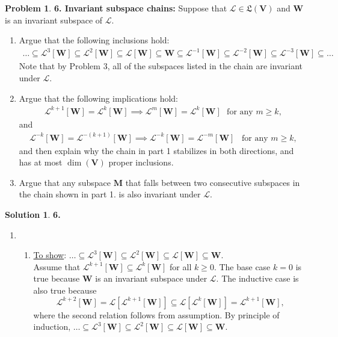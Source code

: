 \documentclass{book}
\theoremstyle{definition}
\newtheorem*{prob*}{Problem}
\newtheorem*{sln*}{Solution}
\newcommand{\V}{\mathbf{V}}
\newcommand{\W}{\mathbf{W}}
\newcommand{\lag}{\mathcal{L}}
\begin{document}
\newpage

\begin{prob*}\textbf{6. Invariant subspace chains:} Suppose that $\lag \in \mathfrak{L}(\V)$ and $\W$ is an invariant subspace of $\lag$. 
	\begin{enumerate}
		\item Argue that the following inclusions hold:
		\begin{align*}
		\dots \subseteq \lag^3[\W] \subseteq \lag^2[\W]\subseteq \lag [\W] \subseteq \W \subseteq \lag^{-1}[\W] \subseteq \lag^{-2}[\W] \subseteq \lag^{-3}[\W]\subseteq\dots
		\end{align*}
		Note that by Problem 3, all of the subspaces listed in the chain are invariant under $\lag$.
		\item Argue that the following implications hold:
		\begin{align*}
		\lag^{k+1}[\W] = \lag^{k}[\W] \implies \lag^m[\W] = \lag^k[\W]\,\,\,\, \text{for any } m\geq k,
		\end{align*}
		and 
		\begin{align*}
		\lag^{-k}[\W] = \lag^{-(k+1)}[\W] \implies \lag^{-k}[\W] = \lag^{-m}[\W]\,\,\,\,\, \text{for any } m\geq k,
		\end{align*}
		and then explain why the chain in part 1 stabilizes in both directions, and has at most $\dim(\V)$ proper inclusions. 
		\item Argue that any subspace $\mathbf{M}$ that falls between two consecutive subspaces in the chain shown in part 1. is also invariant under $\lag$. 
		
		
	\end{enumerate}
	\begin{sln*}\textbf{6.}
		$\,$
		\begin{enumerate}
			\item 
			\begin{enumerate}
				\item \underline{To show}: $\dots \subseteq \lag^3[\W] \subseteq \lag^2[\W]\subseteq \lag [\W] \subseteq \W$.\\
				
				Assume that $ \lag^{k+1}[\W] \subseteq \lag^k[\W] $ for all $k\geq 0$. The base case $k=0$ is true because $\W$ is an invariant subspace under $\lag$. The inductive case is also true because $$ \lag^{k+2}[\W] = \lag[\lag^{k+1}[\W]] \subseteq \lag[\lag^k[\W]] = \lag^{k+1}[\W],$$ where the second relation follows from assumption. By principle of induction, $\dots \subseteq \lag^3[\W] \subseteq \lag^2[\W]\subseteq \lag [\W] \subseteq \W$.\\
				

\end{enumerate}
\end{enumerate}
\end{sln*}
\end{prob*}
\end{document}
